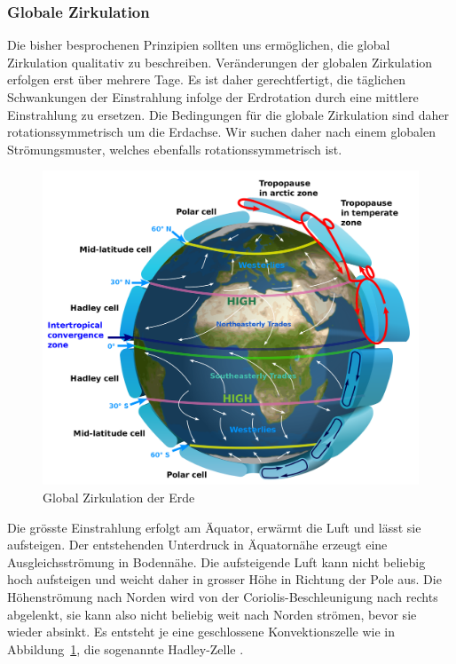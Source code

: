 \subsubsection{Globale Zirkulation}
Die bisher besprochenen Prinzipien sollten uns ermöglichen, die
global Zirkulation qualitativ zu beschreiben.
Veränderungen der globalen Zirkulation erfolgen erst über mehrere Tage.
Es ist daher gerechtfertigt, die täglichen Schwankungen der
Einstrahlung infolge der Erdrotation durch eine mittlere
Einstrahlung zu ersetzen.
Die Bedingungen für die globale Zirkulation sind daher rotationssymmetrisch
um die Erdachse.
Wir suchen daher nach einem globalen Strömungsmuster, welches ebenfalls
rotationssymmetrisch ist.

\begin{figure}
\centering
\includegraphics[width=\hsize]{chapters/1/Earth_Global_Circulation_-_en.png}
\caption{Global Zirkulation der Erde
\label{skript:globalezirkulation}}
\end{figure}

Die grösste Einstrahlung erfolgt am Äquator, erwärmt die Luft und
lässt sie aufsteigen.
Der entstehenden Unterdruck in Äquatornähe erzeugt eine 
Ausgleichsströmung in Bodennähe.
Die aufsteigende Luft kann nicht beliebig hoch aufsteigen und weicht
daher in grosser Höhe in Richtung der Pole aus.
Die Höhenströmung nach Norden wird von der Coriolis-Beschleunigung nach
rechts abgelenkt, sie kann also nicht beliebig weit nach Norden
strömen, bevor sie wieder absinkt.
Es entsteht je eine geschlossene Konvektionszelle wie in
Abbildung~\ref{skript:globalezirkulation}, die sogenannte
Hadley-Zelle \cite{skript:hadley}.

